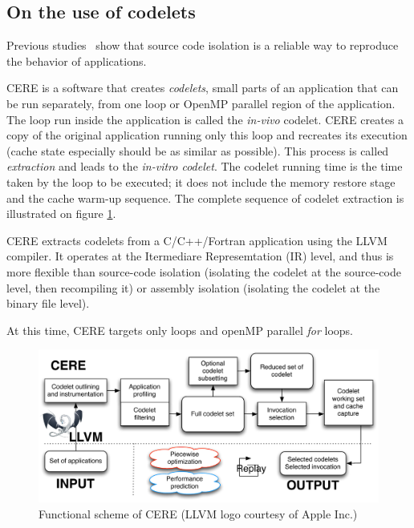 \documentclass{article}
\begin{document}
\begin{multicols}{2}
\subsection{On the use of codelets}
Previous studies~\cite{CERE} show that source code isolation is a reliable way to reproduce the behavior of applications. 

CERE is a software that creates \textit{codelets}, small parts of an application that can be run separately, from one loop 
or OpenMP parallel region of the application.
The loop run inside the application is called the \textit{in-vivo} codelet. CERE creates a copy of the original application running only this loop and recreates its execution (cache state especially should be as similar as possible). This process is called \textit{extraction} and leads to the \textit{in-vitro codelet}. The codelet running time is the time taken by the loop to be executed; it does not include the memory restore stage and the cache warm-up sequence. The complete sequence of codelet extraction is illustrated on figure \ref{CERE_schema}.


CERE extracts codelets from a C/C++/Fortran application using the LLVM compiler. It operates at the Itermediare Represemtation (IR) level, and thus is more flexible than source-code isolation (isolating the codelet at the source-code level, then recompiling it) or assembly isolation (isolating the codelet at the binary file level)\cite{CERE}. 

At this time, CERE targets only loops and openMP parallel \textit{for} loops.


\end{multicols}
\begin{figure}[ht]
\begin{center}
\includegraphics[width=0.85\linewidth]{cere_fonction.pdf}
\caption{\label{CERE_schema}Functional scheme of CERE (LLVM logo courtesy of Apple Inc.)}
\end{center}
\end{figure}
\end{document}
